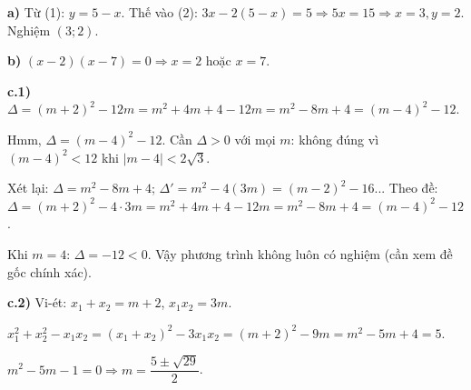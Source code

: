 \begin{loi_giai_cau}
\textbf{a)} Từ (1): $y=5-x$. Thế vào (2): $3x-2(5-x)=5\Rightarrow5x=15\Rightarrow x=3,y=2$. Nghiệm $\boxed{(3;2)}$.

\textbf{b)} $(x-2)(x-7)=0\Rightarrow\boxed{x=2}$ hoặc $\boxed{x=7}$.

\textbf{c.1)} $\Delta=(m+2)^2-12m=m^2+4m+4-12m=m^2-8m+4=(m-4)^2-12$.

Hmm, $\Delta=(m-4)^2-12$. Cần $\Delta>0$ với mọi $m$: không đúng vì $(m-4)^2<12$ khi $|m-4|<2\sqrt{3}$.

Xét lại: $\Delta=m^2-8m+4$; $\Delta'=m^2-4(3m)=(m-2)^2-16$... Theo đề: $\Delta=(m+2)^2-4\cdot3m=m^2+4m+4-12m=m^2-8m+4=(m-4)^2-12$.

Khi $m=4$: $\Delta=-12<0$. Vậy phương trình không luôn có nghiệm (cần xem đề gốc chính xác).

\textbf{c.2)} Vi-ét: $x_1+x_2=m+2$, $x_1x_2=3m$.

$x_1^2+x_2^2-x_1x_2=(x_1+x_2)^2-3x_1x_2=(m+2)^2-9m=m^2-5m+4=5$.

$m^2-5m-1=0\Rightarrow m=\dfrac{5\pm\sqrt{29}}{2}$.
\end{loi_giai_cau}
